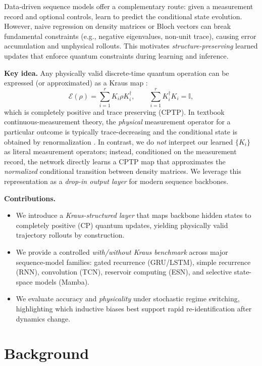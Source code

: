 \documentclass{article} %
\providecommand{\cE}{\mathcal{E}}
\providecommand{\Id}{\mathbb{I}}
\providecommand{\rh}{\rho}
\begin{document}
Data-driven sequence models offer a complementary route: given a measurement record and optional controls, learn to predict the conditional state evolution. However, naive regression on density matrices or Bloch vectors can break fundamental constraints (e.g., negative eigenvalues, non-unit trace), causing error accumulation and unphysical rollouts.
This motivates \emph{structure-preserving} learned updates that enforce quantum constraints during learning and inference.

\textbf{Key idea.} Any physically valid discrete-time quantum operation can be expressed (or approximated) as a Kraus map \citep{kraus1983states,nielsen2010quantum}:
\begin{equation}
\cE(\rh)=\sum_{i=1}^{r} K_i \rh K_i^\dagger,
\qquad \sum_{i=1}^{r} K_i^\dagger K_i = \Id,
\label{eq:kraus_cptp}
\end{equation}
which is completely positive and trace preserving (CPTP). In textbook continuous-measurement theory, the \emph{physical} measurement operator for a particular outcome is typically trace-decreasing and the conditional state is obtained by renormalization \citep{wiseman2010quantum,rouchon2022tutorial}. In contrast, we do \emph{not} interpret our learned $\{K_i\}$ as literal measurement operators; instead, conditioned on the measurement record, the network directly learns a CPTP map that approximates the \emph{normalized} conditional transition between density matrices.
We leverage this representation as a \emph{drop-in output layer} for modern sequence backbones.


\textbf{Contributions.}
\begin{itemize}
  \item We introduce a \emph{Kraus-structured layer} that maps backbone hidden states to completely positive (CP) quantum updates, yielding physically valid trajectory rollouts by construction.
  \item We provide a controlled \emph{with/without Kraus benchmark} across major sequence-model families: gated recurrence (GRU/LSTM), simple recurrence (RNN), convolution (TCN), reservoir computing (ESN), and selective state-space models (Mamba).
  \item We evaluate accuracy and \emph{physicality} under stochastic regime switching,
highlighting which inductive biases best support rapid re-identification after dynamics change.
\end{itemize}


\section{Background}
\end{document}
